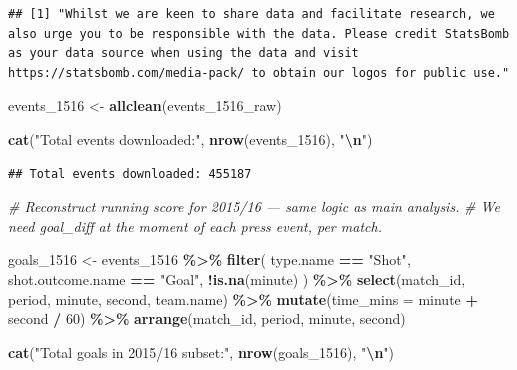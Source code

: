 \documentclass[
]{article}
\newenvironment{Shaded}{\begin{snugshade}}{\end{snugshade}}
\newcommand{\AttributeTok}[1]{\textcolor[rgb]{0.13,0.29,0.53}{#1}}
\newcommand{\CommentTok}[1]{\textcolor[rgb]{0.56,0.35,0.01}{\textit{#1}}}
\newcommand{\DecValTok}[1]{\textcolor[rgb]{0.00,0.00,0.81}{#1}}
\newcommand{\FunctionTok}[1]{\textcolor[rgb]{0.13,0.29,0.53}{\textbf{#1}}}
\newcommand{\NormalTok}[1]{#1}
\newcommand{\OtherTok}[1]{\textcolor[rgb]{0.56,0.35,0.01}{#1}}
\newcommand{\SpecialCharTok}[1]{\textcolor[rgb]{0.81,0.36,0.00}{\textbf{#1}}}
\newcommand{\StringTok}[1]{\textcolor[rgb]{0.31,0.60,0.02}{#1}}
\begin{document}
\begin{verbatim}
## [1] "Whilst we are keen to share data and facilitate research, we also urge you to be responsible with the data. Please credit StatsBomb as your data source when using the data and visit https://statsbomb.com/media-pack/ to obtain our logos for public use."
\end{verbatim}

\begin{Shaded}
\begin{Highlighting}[]
\NormalTok{events\_1516     }\OtherTok{\textless{}{-}} \FunctionTok{allclean}\NormalTok{(events\_1516\_raw)}

\FunctionTok{cat}\NormalTok{(}\StringTok{"Total events downloaded:"}\NormalTok{, }\FunctionTok{nrow}\NormalTok{(events\_1516), }\StringTok{"}\SpecialCharTok{\textbackslash{}n}\StringTok{"}\NormalTok{)}
\end{Highlighting}
\end{Shaded}

\begin{verbatim}
## Total events downloaded: 455187
\end{verbatim}

\begin{Shaded}
\begin{Highlighting}[]
\CommentTok{\# Reconstruct running score for 2015/16 — same logic as main analysis.}
\CommentTok{\# We need goal\_diff at the moment of each press event, per match.}

\NormalTok{goals\_1516 }\OtherTok{\textless{}{-}}\NormalTok{ events\_1516 }\SpecialCharTok{\%\textgreater{}\%}
  \FunctionTok{filter}\NormalTok{(}
\NormalTok{    type.name         }\SpecialCharTok{==} \StringTok{"Shot"}\NormalTok{,}
\NormalTok{    shot.outcome.name }\SpecialCharTok{==} \StringTok{"Goal"}\NormalTok{,}
    \SpecialCharTok{!}\FunctionTok{is.na}\NormalTok{(minute)}
\NormalTok{  ) }\SpecialCharTok{\%\textgreater{}\%}
  \FunctionTok{select}\NormalTok{(match\_id, period, minute, second, team.name) }\SpecialCharTok{\%\textgreater{}\%}
  \FunctionTok{mutate}\NormalTok{(}\AttributeTok{time\_mins =}\NormalTok{ minute }\SpecialCharTok{+}\NormalTok{ second }\SpecialCharTok{/} \DecValTok{60}\NormalTok{) }\SpecialCharTok{\%\textgreater{}\%}
  \FunctionTok{arrange}\NormalTok{(match\_id, period, minute, second)}

\FunctionTok{cat}\NormalTok{(}\StringTok{"Total goals in 2015/16 subset:"}\NormalTok{, }\FunctionTok{nrow}\NormalTok{(goals\_1516), }\StringTok{"}\SpecialCharTok{\textbackslash{}n}\StringTok{"}\NormalTok{)}
\end{Highlighting}
\end{Shaded}
\end{document}
